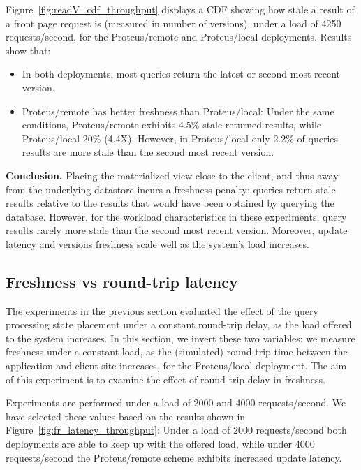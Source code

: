 Figure~\ref{fig:readV_cdf_throughput} displays a CDF showing how stale a result of a front page request is
(measured in number of versions),
under a load of 4250 requests/second, for the Proteus/remote and Proteus/local deployments.
Results show that:
\begin{itemize}
  \item In both deployments, most queries return the latest or second most recent version.
  \item Proteus/remote has better freshness than Proteus/local:
  Under the same conditions, Proteus/remote exhibits 4.5\% stale returned results,
  while Proteus/local 20\% (4.4X).
  However, in Proteus/local only 2.2\% of queries results are more stale than the second most recent version.
\end{itemize}

\medskip
\noindent
\textbf{Conclusion.}
Placing the materialized view close to the client, and thus away from the underlying datastore incurs a freshness penalty:
queries return stale results relative to the results that would have been obtained by querying the database.
However, for the workload characteristics in these experiments,
query results rarely more stale than the second most recent version.
Moreover, update latency and versions freshness scale well as the system's load increases.


\subsection{Freshness vs round-trip latency}
\label{sec:eval_freshness_rtt}

The experiments in the previous section evaluated the effect of the query processing state placement under a constant
round-trip delay, as the load offered to the system increases.
In this section, we invert these two variables:
we measure freshness under a constant load,
as the (simulated) round-trip time between the application and client site increases,
for the Proteus/local deployment.
The aim of this experiment is to examine the effect of round-trip delay in freshness.

Experiments are performed under a load of 2000 and 4000 requests/second.
We have selected these values based on the results shown in Figure~\ref{fig:fr_latency_throughput}:
Under a load of 2000 requests/second both deployments are able to keep up with the offered load,
while under 4000 requests/second the Proteus/remote scheme exhibits increased update latency.

